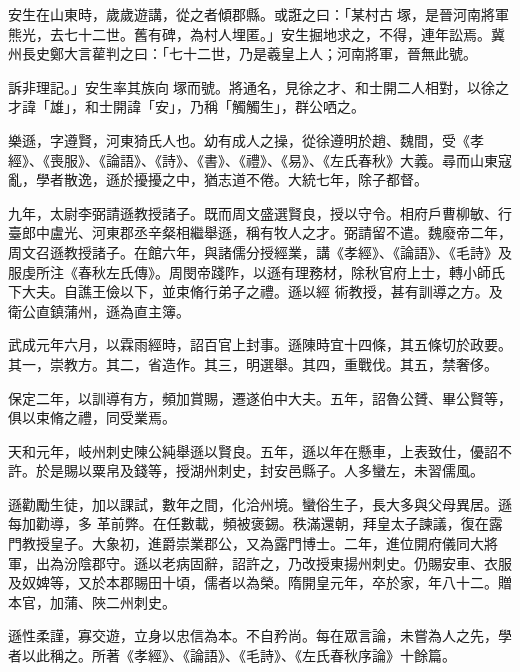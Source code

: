 \begin{pinyinscope}
 安生在山東時，歲歲遊講，從之者傾郡縣。或誑之曰：「某村古塚，是晉河南將軍熊光，去七十二世。舊有碑，為村人埋匿。」安生掘地求之，不得，連年訟焉。冀州長史鄭大言雚判之曰：「七十二世，乃是羲皇上人；河南將軍，晉無此號。



 訴非理記。」安生率其族向塚而號。將通名，見徐之才、和士開二人相對，以徐之才諱「雄」，和士開諱「安」，乃稱「觸觸生」，群公哂之。



 樂遜，字遵賢，河東猗氏人也。幼有成人之操，從徐遵明於趙、魏間，受《孝經》、《喪服》、《論語》、《詩》、《書》、《禮》、《易》、《左氏春秋》大義。尋而山東寇亂，學者散逸，遜於擾擾之中，猶志道不倦。大統七年，除子都督。



 九年，太尉李弼請遜教授諸子。既而周文盛選賢良，授以守令。相府戶曹柳敏、行臺郎中盧光、河東郡丞辛粲相繼舉遜，稱有牧人之才。弼請留不遣。魏廢帝二年，周文召遜教授諸子。在館六年，與諸儒分授經業，講《孝經》、《論語》、《毛詩》及服虔所注《春秋左氏傳》。周閔帝踐阼，以遜有理務材，除秋官府上士，轉小師氏下大夫。自譙王儉以下，並束脩行弟子之禮。遜以經
 術教授，甚有訓導之方。及衛公直鎮蒲州，遜為直主簿。



 武成元年六月，以霖雨經時，詔百官上封事。遜陳時宜十四條，其五條切於政要。其一，崇教方。其二，省造作。其三，明選舉。其四，重戰伐。其五，禁奢侈。



 保定二年，以訓導有方，頻加賞賜，遷遂伯中大夫。五年，詔魯公贇、畢公賢等，俱以束脩之禮，同受業焉。



 天和元年，岐州刺史陳公純舉遜以賢良。五年，遜以年在懸車，上表致仕，優詔不許。於是賜以粟帛及錢等，授湖州刺史，封安邑縣子。人多蠻左，未習儒風。



 遜勸勵生徒，加以課試，數年之間，化洽州境。蠻俗生子，長大多與父母異居。遜每加勸導，多
 革前弊。在任數載，頻被褒錫。秩滿還朝，拜皇太子諫議，復在露門教授皇子。大象初，進爵崇業郡公，又為露門博士。二年，進位開府儀同大將軍，出為汾陰郡守。遜以老病固辭，詔許之，乃改授東揚州刺史。仍賜安車、衣服及奴婢等，又於本郡賜田十頃，儒者以為榮。隋開皇元年，卒於家，年八十二。贈本官，加蒲、陜二州刺史。



 遜性柔謹，寡交遊，立身以忠信為本。不自矜尚。每在眾言論，未嘗為人之先，學者以此稱之。所著《孝經》、《論語》、《毛詩》、《左氏春秋序論》十餘篇。




\end{pinyinscope}
